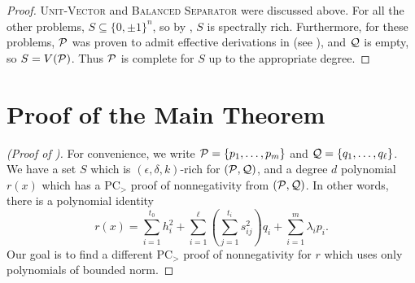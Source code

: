 \begin{proof}
\textsc{Unit-Vector} and \textsc{Balanced Separator} were discussed above. For all the other problems, $S \subseteq \{0,\pm 1\}^n$, so by , $S$ is spectrally rich. Furthermore, for these problems, $\mathcal P$ was proven to admit effective derivations in  (see ), and $\mathcal Q$ is empty, so $S = V(\mathcal P)$. Thus $\mathcal P$ is complete for $S$ up to the appropriate degree. 
\end{proof}

\section{Proof of the Main Theorem}\label{sec:bc_proof_main}
\begin{proof}[(Proof of )]
For convenience, we write $\mathcal P = \{p_1,\dots,p_m\}$ and $\mathcal Q = \{q_1,\dots,q_\ell\}$. We have a set $S$ which is $(\epsilon,\delta,k)$-rich for $(\mathcal P,\mathcal Q)$, and a degree $d$ polynomial $r(x)$ which has a PC$_>$ proof of nonnegativity from $(\mathcal P,\mathcal Q)$. In other words, there is a polynomial identity
\[r(x) = \sum_{i=1}^{t_0} h_i^2 + \sum_{i=1}^\ell \left(\sum_{j=1}^{t_i} s_{ij}^2\right) q_i + \sum_{i=1}^m \lambda_i p_i.\]
Our goal is to find a different PC$_>$ proof of nonnegativity for $r$ which uses only polynomials of bounded norm.


\end{proof}
